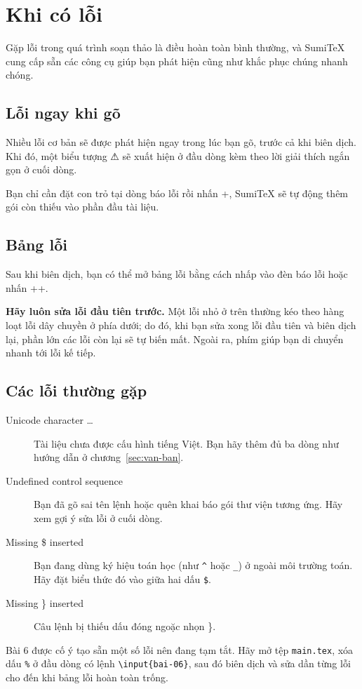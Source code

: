 \section{Khi có lỗi}
\label{sec:loi}

Gặp lỗi trong quá trình soạn thảo là điều hoàn toàn bình thường, và SumiTeX
cung cấp sẵn các công cụ giúp bạn phát hiện cũng như khắc phục chúng nhanh
chóng.

\subsection{Lỗi ngay khi gõ}
Nhiều lỗi cơ bản sẽ được phát hiện ngay trong lúc bạn gõ, trước cả khi biên
dịch. Khi đó, một biểu tượng ⚠ sẽ xuất hiện ở đầu dòng kèm theo lời giải thích
ngắn gọn ở cuối dòng.


Bạn chỉ cần đặt con trỏ tại dòng báo lỗi rồi nhấn +, SumiTeX
sẽ tự động thêm gói còn thiếu vào phần đầu tài liệu.

\subsection{Bảng lỗi}
Sau khi biên dịch, bạn có thể mở bảng lỗi bằng cách nhấp vào đèn báo lỗi hoặc
nhấn ++.


\begin{meo}
\textbf{Hãy luôn sửa lỗi đầu tiên trước.} Một lỗi nhỏ ở trên thường kéo theo
hàng loạt lỗi dây chuyền ở phía dưới; do đó, khi bạn sửa xong lỗi đầu tiên và
biên dịch lại, phần lớn các lỗi còn lại sẽ tự biến mất. Ngoài ra, phím 
giúp bạn di chuyển nhanh tới lỗi kế tiếp.
\end{meo}

\subsection{Các lỗi thường gặp}
\begin{description}
  \item[Unicode character …] Tài liệu chưa được cấu hình tiếng Việt. Bạn hãy
    thêm đủ ba dòng  như hướng dẫn ở chương~\ref{sec:van-ban}.
  \item[Undefined control sequence] Bạn đã gõ sai tên lệnh hoặc quên khai báo
    gói thư viện tương ứng. Hãy xem gợi ý sửa lỗi ở cuối dòng.
  \item[Missing \$ inserted] Bạn đang dùng ký hiệu toán học (như \verb|^| hoặc
    \verb|_|) ở ngoài môi trường toán. Hãy đặt biểu thức đó vào giữa hai dấu
    \texttt{\$}.
  \item[Missing \} inserted] Câu lệnh bị thiếu dấu đóng ngoặc nhọn \}.
\end{description}

\begin{thuchanh}[Bài 6]
Bài 6 được cố ý tạo sẵn một số lỗi nên đang tạm tắt. Hãy mở tệp
\texttt{main.tex}, xóa dấu \texttt{\%} ở đầu dòng có lệnh
\texttt{\textbackslash input\{bai-06\}}, sau đó biên dịch và sửa dần từng lỗi
cho đến khi bảng lỗi hoàn toàn trống.
\end{thuchanh}